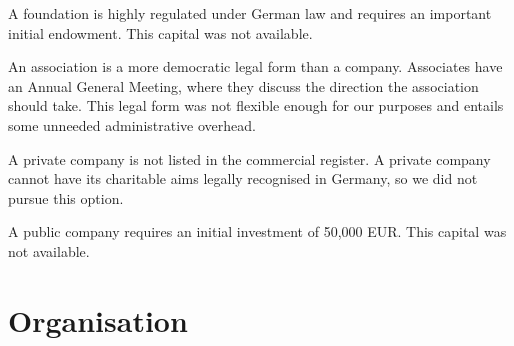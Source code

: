 \documentclass[output=guidelines,nonflat
]{langsci/langscibook}
\newcommand{\othersolutions}[1]{
  \renewcommand{\tblslinecolour}{lsDarkGreenOne}
  \tblssy{more}{Other solutions}{#1}
}
\renewcommand{\tblssy}[4][black!12]{%
  \renewcommand{\langscisymbol}{#2}\renewcommand{\tblsboxcolor}{#1}
  \begin{mdframed}[style=yellowexercise,frametitle={#3}]
    #4
  \end{mdframed}
}
\begin{document}
\othersolutions{
A foundation is highly regulated under German law and requires an important initial endowment. This capital was not available. 

An association is a more democratic legal form than a company. Associates have an Annual General Meeting, where they discuss the direction the association should take. This legal form was not flexible enough for our purposes and entails some unneeded administrative overhead. 

A private company is not listed in the  commercial register. A private company cannot have its charitable aims legally recognised in Germany, so we did not pursue this option. 

A public company requires an initial investment of 50,000 EUR. This capital was not available. 
}
 

\section{Organisation}
\end{document}
